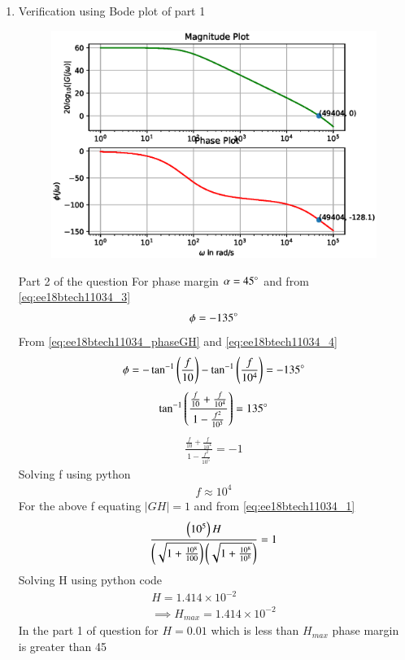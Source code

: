 \begin{enumerate}[label=\thesubsection.\arabic*.,ref=\thesubsection.\theenumi]
\item Verification using Bode plot of part 1
\begin{figure}[!h]
\centering
\includegraphics[width=\columnwidth]{./figs/ee18btech11034/ee18btech11034_1.eps}
\caption{}
\label{fig:ee18btech11034_1}
\end{figure}

\solution Part 2 of the question
For phase margin $\alpha=45\degree$ and from \eqref{eq:ee18btech11034_3}
\begin{align}
    \phi = -135\degree
    \label{eq:ee18btech11034_4}
\end{align}
From \eqref{eq:ee18btech11034_phaseGH} and \eqref{eq:ee18btech11034_4}
\begin{align}
    \phi = -\tan^{-1}\left(\frac{f}{10}\right) -\tan^{-1}\left(\frac{f}{10^{4}}\right)  = -135\degree
 \end{align}
 \begin{align}
\tan^{-1}\left(\frac{\frac{f}{10} + \frac{f}{10^{4}}}{1-\frac{f^2}{10^{5}}}\right) = 135\degree
\end{align}
\begin{align}
    \frac{\frac{f}{10} + \frac{f}{10^{4}}}{1-\frac{f^2}{10^{5}}} = -1
\end{align}
Solving f using python
\begin{align}
    f \approx 10^{4}
\end{align}
For the above f equating $|GH|=1$ and from \eqref{eq:ee18btech11034_1}
\begin{align}
    \frac{\left(10^{5}\right)H}{\left(\sqrt{1+\frac{10^{8}}{100}}\right)\left(\sqrt{1+\frac{10^{8}}{10^{8}}}\right)} = 1
\end{align}
Solving H using python code
\begin{align}
    H = 1.414 \times 10^{-2}
    \\
    \implies H_{max} =  1.414 \times 10^{-2}
\end{align}
In the part 1 of question for $H = 0.01$ which is less than $H_{max}$ phase margin is greater than 45\degree


\end{enumerate}
